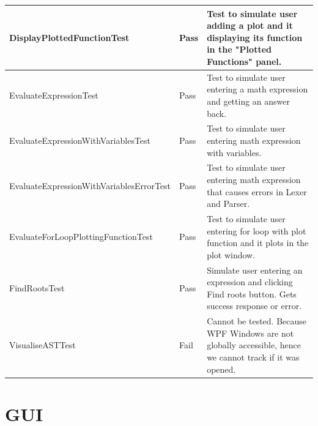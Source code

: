 \documentclass[a4paper, oneside, 11pt]{report}
\begin{document}
\begin{table}[H]
{\begin{tabular}{|l|l|l|}
DisplayPlottedFunctionTest               & Pass               & Test to simulate user adding a plot and it displaying its function in the "Plotted Functions" panel.       \\ \hline
EvaluateExpressionTest                   & Pass               & Test to simulate user entering a math expression and getting an answer back.                               \\ \hline
EvaluateExpressionWithVariablesTest      & Pass               & Test to simulate user entering math expression with variables.                                             \\ \hline
EvaluateExpressionWithVariablesErrorTest & Pass               & Test to simulate user entering math expression that causes errors in Lexer and Parser.                     \\ \hline
EvaluateForLoopPlottingFunctionTest      & Pass               & Test to simulate user entering for loop with plot function and it plots in the plot window.                \\ \hline
FindRootsTest                            & Pass               & Simulate user entering an expression and clicking Find roots button. Gets success response or error.       \\ \hline
VisualiseASTTest                         & Fail               & Cannot be tested. Because WPF Windows are not globally accessible, hence we cannot track if it was opened. \\ \hline
\end{tabular}
}
\end{table}


\chapter{GUI}
\label{app:gui}
\end{document}
